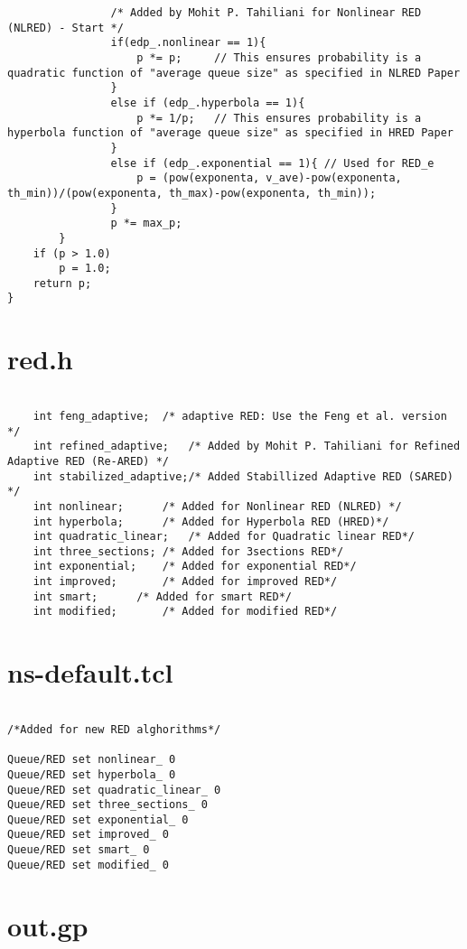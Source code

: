 \begin{verbatim}
                /* Added by Mohit P. Tahiliani for Nonlinear RED (NLRED) - Start */
				if(edp_.nonlinear == 1){
					p *= p;		// This ensures probability is a quadratic function of "average queue size" as specified in NLRED Paper
				}
				else if (edp_.hyperbola == 1){
					p *= 1/p;	// This ensures probability is a hyperbola function of "average queue size" as specified in HRED Paper
				}
				else if (edp_.exponential == 1){ // Used for RED_e
					p = (pow(exponenta, v_ave)-pow(exponenta, th_min))/(pow(exponenta, th_max)-pow(exponenta, th_min));
				}
                p *= max_p; 
        }
	if (p > 1.0)
		p = 1.0;
	return p;
}
\end{verbatim}

\section*{red.h}

\begin{verbatim}

	int feng_adaptive;	/* adaptive RED: Use the Feng et al. version */
	int refined_adaptive;	/* Added by Mohit P. Tahiliani for Refined Adaptive RED (Re-ARED) */
	int stabilized_adaptive;/* Added Stabillized Adaptive RED (SARED) */
	int nonlinear;		/* Added for Nonlinear RED (NLRED) */
	int hyperbola;		/* Added for Hyperbola RED (HRED)*/
	int quadratic_linear;   /* Added for Quadratic linear RED*/
	int three_sections;	/* Added for 3sections RED*/
	int exponential;	/* Added for exponential RED*/
	int improved;		/* Added for improved RED*/
	int smart;		/* Added for smart RED*/
	int modified;		/* Added for modified RED*/	 
\end{verbatim}

\section*{ns-default.tcl}

\begin{verbatim}

/*Added for new RED alghorithms*/

Queue/RED set nonlinear_ 0
Queue/RED set hyperbola_ 0
Queue/RED set quadratic_linear_ 0
Queue/RED set three_sections_ 0
Queue/RED set exponential_ 0
Queue/RED set improved_ 0
Queue/RED set smart_ 0
Queue/RED set modified_ 0
\end{verbatim}


\section*{out.gp}


